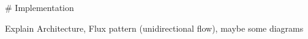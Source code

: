 \begin{markdown}

# Implementation

Explain Architecture, Flux pattern (unidirectional flow), maybe some diagrams
    
\end{markdown}
